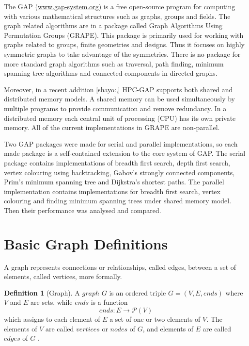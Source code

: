 \documentclass{report}
\theoremstyle{plain}
\theoremstyle{definition}
\newtheorem{definition}{Definition}
\theoremstyle{remark}
\numberwithin{definition}{chapter}
\numberwithin{example}{chapter}
\numberwithin{figure}{chapter}
\begin{document}
The GAP (\url{www.gap-system.org}) is a free open-source program for computing with various mathematical structures such as graphs, groups and fields. The graph related algorithms are in a package called Graph Algorithms Using Permutation Groups (GRAPE). This package is primarily used for working with graphs related to groups, finite geometries and designs. Thus it focuses on highly symmetric graphs to take advantage of the symmetries. There is no package for more standard graph algorithms such as traversal, path finding, minimum spanning tree algorithms and connected components in directed graphs.

Moreover, in a recent addition [shayo:,] HPC-GAP supports both shared and distributed memory models. A shared memory can be used simultaneously by multiple programs to provide communication and remove redundancy. In a distributed memory each central unit of processing (CPU) has its own private memory. All of the current implementations in GRAPE are non-parallel.

Two GAP packages were made for serial and parallel implementations, so each made package is a self-contained extension to the core system of GAP. The serial package contains implementations of breadth first search, depth first search, vertex colouring using backtracking, Gabov's strongly connected components, Prim's minimum spanning tree and Dijkstra's shortest paths. The parallel implementation contains implementations for breadth first search, vertex colouring and finding minimum spanning trees under shared memory model. Then their performance was analysed and compared.

\section{Basic Graph Definitions}

A graph represents connections or relationships, called edges, between a set of elements, called vertices, more formally.

\begin{definition}[Graph]
A $graph$  $G$ is an ordered triple $G = (V, E, ends)$ where $V$ and $E$ are sets, while $ends$ is a function 
  \begin{equation}
  ends:E\to \mathcal P \left({V}\right)
  \end{equation}
which assigns to each element of $E$ a set of one or two elements of $V$. The elements of $V$ are called $vertices$ or $nodes$ of $G$, and elements of $E$ are called $edges$ of $G$ \cite{bondy2008graph}.
\end{definition}
\end{document}
